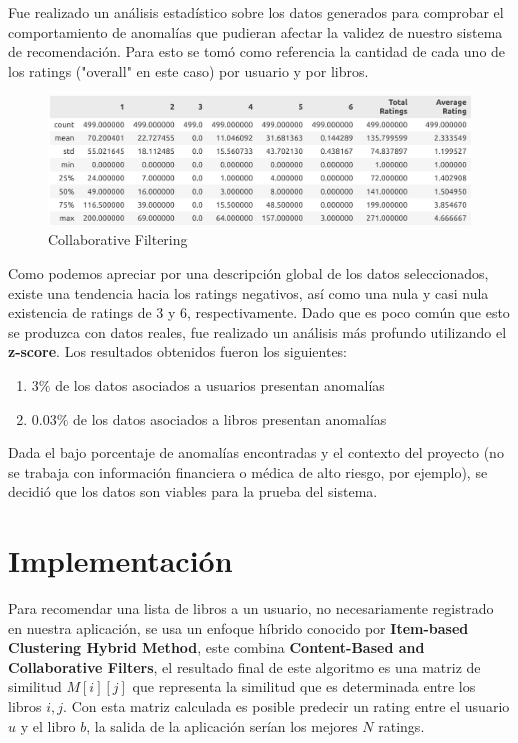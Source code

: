 \documentclass[14pt]{extarticle}
\begin{document}
Fue realizado un análisis estadístico sobre los datos generados para comprobar el comportamiento de anomalías que pudieran afectar la validez de nuestro sistema de recomendación. Para esto se tomó como referencia la cantidad de cada uno de los ratings ("overall" en este caso) por usuario y por libros.

\begin{figure}[H]
    \centering
    \includegraphics[width=\textwidth]{./images/general_stats.png}
    \caption{Collaborative Filtering}
    \label{Collaborative Filtering}
\end{figure}

Como podemos apreciar por una descripción global de los datos seleccionados, existe una tendencia hacia los ratings negativos, así como una nula y casi nula existencia de ratings de 3 y 6, respectivamente. Dado que es poco común que esto se produzca con datos reales, fue realizado un análisis más profundo utilizando el \textbf{z-score}. Los resultados obtenidos fueron los siguientes:

\begin{enumerate}
    \item $3\%$ de los datos asociados a usuarios presentan anomalías
    \item $0.03\%$ de los datos asociados a libros presentan anomalías
\end{enumerate}

Dada el bajo porcentaje de anomalías encontradas y el contexto del proyecto (no se trabaja con información financiera o médica de alto riesgo, por ejemplo), se decidió que los datos son viables para la prueba del sistema.

\section{Implementación}

Para recomendar una lista de libros a un usuario, no necesariamente registrado en nuestra aplicación, se usa un enfoque híbrido conocido por \textbf{Item-based Clustering Hybrid Method}, este combina \textbf{Content-Based and Collaborative Filters}, el resultado final de este algoritmo es una matriz de similitud $M[i][j]$ que representa la similitud que es determinada entre los libros $i, j$. Con esta matriz calculada es posible predecir un rating entre el usuario $u$ y el libro $b$, la salida de la aplicación serían los mejores $N$ ratings.   
\end{document}
